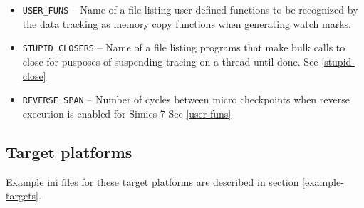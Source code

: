 \documentclass[titlepage]{article}
\begin{document}
\begin{itemize}
\item {\tt USER\_FUNS} -- Name of a file listing user-defined functions to be recognized by the data tracking as memory copy functions when generating watch marks. 
\item {\tt STUPID\_CLOSERS} -- Name of a file listing programs that make bulk calls to close for pusposes of suspending tracing on a thread until done.  See \ref{stupid-close}
\item {\tt REVERSE\_SPAN} -- Number of cycles between micro checkpoints when reverse execution is enabled for Simics 7
See \ref{user-funs}
\end{itemize}

\subsection{Target platforms}
\label{target-platforms}
Example ini files for these target platforms are described in section \ref{example-targets}.
\end{document}

